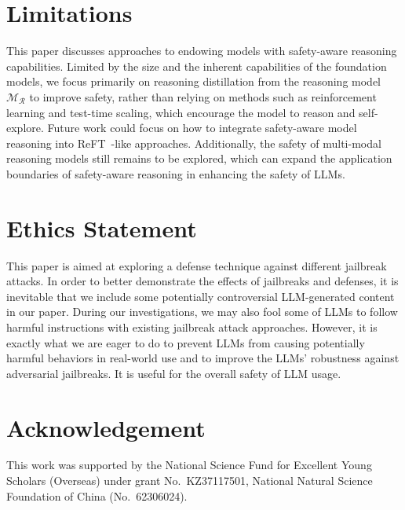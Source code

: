 \section*{Limitations}
This paper discusses approaches to endowing models with safety-aware reasoning capabilities. Limited by the size and the inherent capabilities of the foundation models, we focus primarily on reasoning distillation from the reasoning model $\mathcal{M_R}$ to improve safety, rather than relying on methods such as reinforcement learning and test-time scaling, which encourage the model to reason and self-explore. Future work could focus on how to integrate safety-aware model reasoning into ReFT~\cite{trung-etal-2024-reft}-like approaches. Additionally, the safety of multi-modal reasoning models still remains to be explored, which can expand the application boundaries of safety-aware reasoning in enhancing the safety of LLMs.


\newpage

\section*{Ethics Statement}
This paper is aimed at exploring a defense technique against different jailbreak attacks. In order to better demonstrate the effects of jailbreaks and defenses, it is inevitable that we include some potentially controversial LLM-generated content in our paper. During our investigations, we may also fool some of LLMs to follow harmful instructions with existing jailbreak attack approaches. However, it is exactly what we are eager to do to prevent LLMs from causing potentially harmful behaviors in real-world use and to improve the LLMs' robustness against adversarial jailbreaks. It is useful for the overall safety of LLM usage.

\section*{Acknowledgement}

This work was supported by the National Science Fund for Excellent Young Scholars (Overseas) under grant No.\ KZ37117501, National Natural Science Foundation of China (No.\ 62306024).